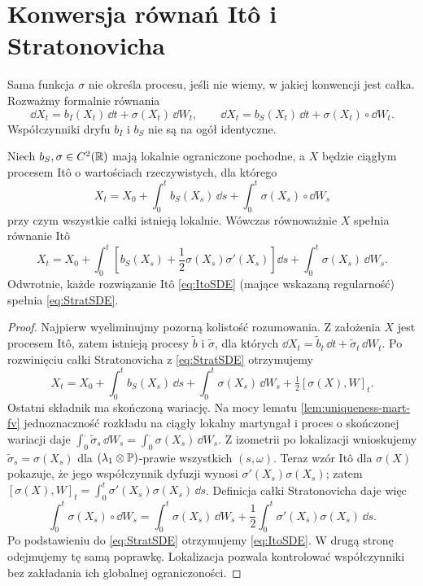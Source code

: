 \section{Konwersja równań Itô i Stratonovicha}
Sama funkcja $\sigma$ nie określa procesu, jeśli nie
wiemy, w jakiej konwencji jest całka. Rozważmy
formalnie równania
\[
\dd X_t=b_I(X_t)\,\dd t+\sigma(X_t)\,\dd W_t,
\qquad
\dd X_t=b_S(X_t)\,\dd t+\sigma(X_t)\circ\dd W_t.
\]
Współczynniki dryfu $b_I$ i $b_S$ nie są na ogół
identyczne.

\begin{twierdzenie}
\label{th:ito-strat-conversion}
Niech $b_S,\sigma\in C^2(\mathbb{R})$ mają lokalnie ograniczone
pochodne, a $X$ będzie ciągłym procesem Itô o
wartościach rzeczywistych, dla którego
\[
X_t=X_0+\int_0^tb_S(X_s)\,\dd s
+\int_0^t\sigma(X_s)\circ\dd W_s
\tag{4.8}\label{eq:StratSDE}
\]
przy czym wszystkie całki istnieją lokalnie.
Wówczas równoważnie $X$ spełnia równanie Itô
\[
X_t=X_0+\int_0^t
\left[b_S(X_s)+\frac12\sigma(X_s)\sigma'(X_s)\right]\dd s
+\int_0^t\sigma(X_s)\,\dd W_s.
\tag{4.9}\label{eq:ItoSDE}
\]
Odwrotnie, każde rozwiązanie Itô \eqref{eq:ItoSDE}
(mające wskazaną regularność) spełnia \eqref{eq:StratSDE}.
\end{twierdzenie}
\begin{proof}
Najpierw wyeliminujmy pozorną kolistość rozumowania.
Z założenia $X$ jest procesem Itô, zatem istnieją
procesy $\widetilde b$ i $\widetilde\sigma$, dla których
$\dd X_t=\widetilde b_t\,\dd t+
\widetilde\sigma_t\,\dd W_t$. Po rozwinięciu całki
Stratonovicha z \eqref{eq:StratSDE} otrzymujemy
\[
X_t=X_0+\int_0^t b_S(X_s)\,\dd s
+\int_0^t\sigma(X_s)\,\dd W_s
+\tfrac12[\sigma(X),W]_t.
\]
Ostatni składnik ma skończoną wariację. Na mocy lematu \ref{lem:uniqueness-mart-fv}
jednoznaczność rozkładu na ciągły lokalny martyngał
i proces o skończonej wariacji daje
$\int_0^.\widetilde\sigma_s\,\dd W_s
=\int_0^.\sigma(X_s)\,\dd W_s$.
Z izometrii po lokalizacji wnioskujemy
$\widetilde\sigma_s=\sigma(X_s)$ dla
$(\lambda_1\otimes\mathbb{P})$-prawie wszystkich $(s,\omega)$.
Teraz wzór Itô dla $\sigma(X)$ pokazuje, że jego
współczynnik dyfuzji wynosi
$\sigma'(X_s)\sigma(X_s)$; zatem
$[\sigma(X),W]_t=\int_0^t\sigma'(X_s)\sigma(X_s)\,\dd s$.
Definicja całki Stratonovicha daje więc
\[
\int_0^t\sigma(X_s)\circ\dd W_s
=\int_0^t\sigma(X_s)\,\dd W_s
+\frac12\int_0^t\sigma'(X_s)\sigma(X_s)\,\dd s.
\]
Po podstawieniu do \eqref{eq:StratSDE} otrzymujemy
\eqref{eq:ItoSDE}. W drugą stronę odejmujemy tę samą
poprawkę. Lokalizacja pozwala kontrolować współczynniki
bez zakładania ich globalnej ograniczoności.
\end{proof}

